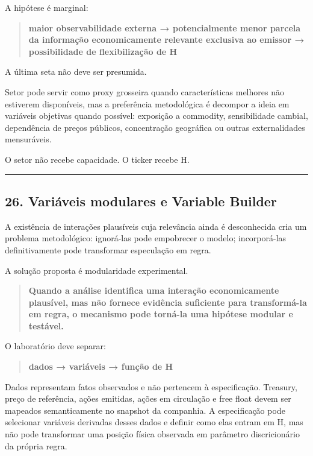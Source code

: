 \documentclass[
  a4paper,
]{article}
\begin{document}
A hipótese é marginal:

\begin{quote}
\textbf{maior observabilidade externa → potencialmente menor parcela da
informação economicamente relevante exclusiva ao emissor → possibilidade
de flexibilização de H}
\end{quote}

A última seta não deve ser presumida.

Setor pode servir como proxy grosseira quando características melhores
não estiverem disponíveis, mas a preferência metodológica é decompor a
ideia em variáveis objetivas quando possível: exposição a commodity,
sensibilidade cambial, dependência de preços públicos, concentração
geográfica ou outras externalidades mensuráveis.

O setor não recebe capacidade. O ticker recebe H.

\begin{center}\rule{0.5\linewidth}{0.5pt}\end{center}

\hypertarget{26-variaveis-modulares-e-variable-builder}{}

\hypertarget{26-variuxe1veis-modulares-e-variable-builder}{%
\subsection{26. Variáveis modulares e Variable
Builder}\label{26-variuxe1veis-modulares-e-variable-builder}}

A existência de interações plausíveis cuja relevância ainda é
desconhecida cria um problema metodológico: ignorá-las pode empobrecer o
modelo; incorporá-las definitivamente pode transformar especulação em
regra.

A solução proposta é modularidade experimental.

\begin{quote}
\textbf{Quando a análise identifica uma interação economicamente
plausível, mas não fornece evidência suficiente para transformá-la em
regra, o mecanismo pode torná-la uma hipótese modular e testável.}
\end{quote}

O laboratório deve separar:

\begin{quote}
\textbf{dados → variáveis → função de H}
\end{quote}

Dados representam fatos observados e não pertencem à especificação.
Treasury, preço de referência, ações emitidas, ações em circulação e
free float devem ser mapeados semanticamente no snapshot da companhia. A
especificação pode selecionar variáveis derivadas desses dados e definir
como elas entram em H, mas não pode transformar uma posição física
observada em parâmetro discricionário da própria regra.
\end{document}
